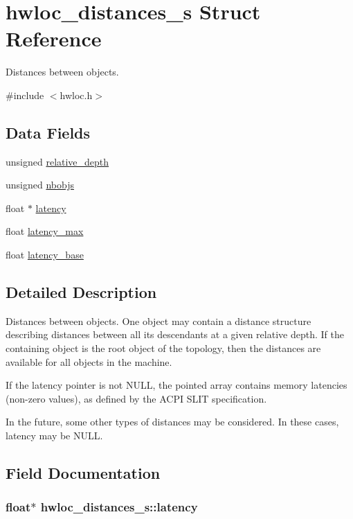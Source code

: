 \hypertarget{a00014}{
\section{hwloc\_\-distances\_\-s Struct Reference}
\label{a00014}
}


Distances between objects.  




{\ttfamily \#include $<$hwloc.h$>$}

\subsection*{Data Fields}
\begin{DoxyCompactItemize}
\item 
unsigned \hyperlink{a00014_a6fe066eaf62ee448aa05bab8e7217ff7}{relative\_\-depth}
\item 
unsigned \hyperlink{a00014_a4ca2af858cebbce7324ec49903d09474}{nbobjs}
\item 
float $\ast$ \hyperlink{a00014_a0f70f48d1bfb18e5e2008825da2967c9}{latency}
\item 
float \hyperlink{a00014_aab61bd1d1ae2e121bfe793c973ec829e}{latency\_\-max}
\item 
float \hyperlink{a00014_a204416418049a272bfb51602fc676342}{latency\_\-base}
\end{DoxyCompactItemize}


\subsection{Detailed Description}
Distances between objects. One object may contain a distance structure describing distances between all its descendants at a given relative depth. If the containing object is the root object of the topology, then the distances are available for all objects in the machine.

If the {\ttfamily latency} pointer is not {\ttfamily NULL}, the pointed array contains memory latencies (non-\/zero values), as defined by the ACPI SLIT specification.

In the future, some other types of distances may be considered. In these cases, {\ttfamily latency} may be {\ttfamily NULL}. 

\subsection{Field Documentation}
\hypertarget{a00014_a0f70f48d1bfb18e5e2008825da2967c9}{
\subsubsection[{latency}]{\setlength{\rightskip}{0pt plus 5cm}float$\ast$ {\bf hwloc\_\-distances\_\-s::latency}}}
\label{a00014_a0f70f48d1bfb18e5e2008825da2967c9}


